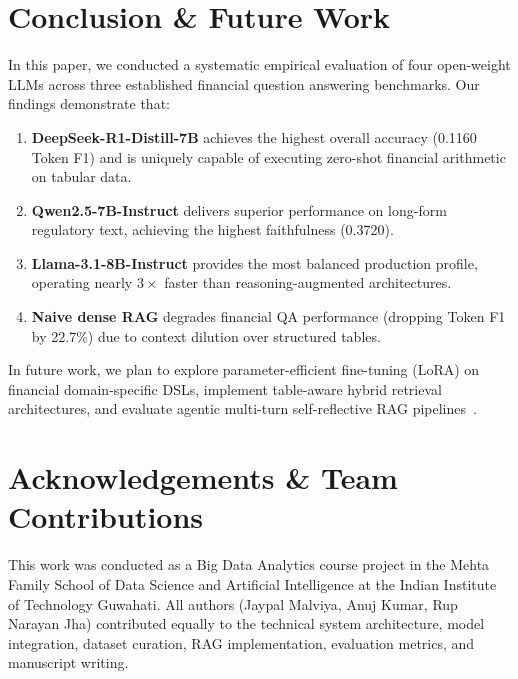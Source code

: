 \documentclass[11pt]{article}
\begin{document}
\section{Conclusion \& Future Work}
\label{sec:conclusion}

In this paper, we conducted a systematic empirical evaluation of four open-weight LLMs across three established financial question answering benchmarks. Our findings demonstrate that:
\begin{enumerate}
    \item \textbf{DeepSeek-R1-Distill-7B} achieves the highest overall accuracy (0.1160 Token F1) and is uniquely capable of executing zero-shot financial arithmetic on tabular data.
    \item \textbf{Qwen2.5-7B-Instruct} delivers superior performance on long-form regulatory text, achieving the highest faithfulness (0.3720).
    \item \textbf{Llama-3.1-8B-Instruct} provides the most balanced production profile, operating nearly $3\times$ faster than reasoning-augmented architectures.
    \item \textbf{Naive dense RAG} degrades financial QA performance (dropping Token F1 by 22.7\%) due to context dilution over structured tables.
\end{enumerate}

In future work, we plan to explore parameter-efficient fine-tuning (LoRA) on financial domain-specific DSLs, implement table-aware hybrid retrieval architectures, and evaluate agentic multi-turn self-reflective RAG pipelines~\citep{asai2023selfrag}.

\section*{Acknowledgements \& Team Contributions}
This work was conducted as a Big Data Analytics course project in the Mehta Family School of Data Science and Artificial Intelligence at the Indian Institute of Technology Guwahati. All authors (Jaypal Malviya, Anuj Kumar, Rup Narayan Jha) contributed equally to the technical system architecture, model integration, dataset curation, RAG implementation, evaluation metrics, and manuscript writing.



\end{document}
